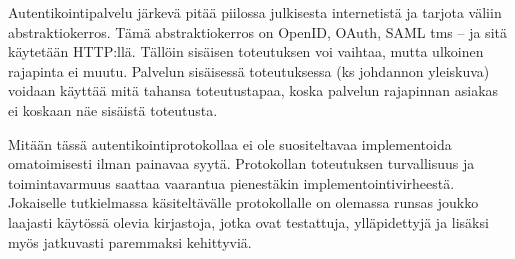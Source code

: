 \documentclass[finnish,gradu]{tktltiki}
\begin{document}
  Autentikointipalvelu järkevä pitää piilossa julkisesta internetistä ja tarjota väliin abstraktiokerros. Tämä abstraktiokerros on OpenID, OAuth, SAML tms -- ja sitä käytetään HTTP:llä. Tällöin sisäisen toteutuksen voi vaihtaa, mutta ulkoinen rajapinta ei muutu. Palvelun sisäisessä toteutuksessa (ks johdannon yleiskuva) voidaan käyttää mitä tahansa toteutustapaa, koska palvelun rajapinnan asiakas ei koskaan näe sisäistä toteutusta.

  Mitään tässä autentikointiprotokollaa ei ole suositeltavaa implementoida omatoimisesti ilman painavaa syytä. Protokollan toteutuksen turvallisuus ja toimintavarmuus saattaa vaarantua pienestäkin implementointivirheestä. Jokaiselle tutkielmassa käsiteltävälle protokollalle on olemassa runsas joukko laajasti käytössä olevia kirjastoja, jotka ovat testattuja, ylläpidettyjä ja lisäksi myös jatkuvasti paremmaksi kehittyviä.



\end{document}
